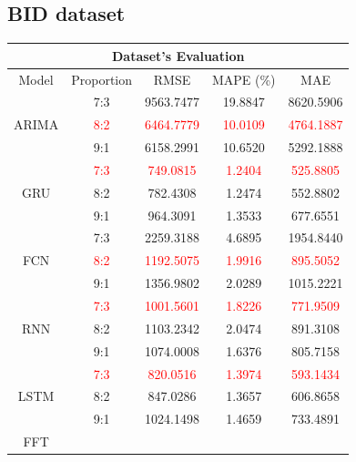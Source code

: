 \documentclass{ieeeojies}
\begin{document}
\subsection{BID dataset} 

\begin{table}[H]
    \centering
    \begin{tabular}{|c|c|c|c|c|}
         \hline
         \multicolumn{5}{|c|}{\textbf{Dataset's Evaluation}}\\
         \hline
         \centering Model & Proportion & RMSE & MAPE (\%) & MAE\\
         \hline
         \multirow{3}{*}{ARIMA} 
         & 7:3 & 9563.7477 & 19.8847 & 8620.5906 \\ 
         & \textcolor{red}{8:2} & \textcolor{red}{6464.7779} & \textcolor{red}{10.0109} & \textcolor{red}{4764.1887} \\ 
         & 9:1 & 6158.2991 & 10.6520 & 5292.1888 \\
         \hline
         \multirow{3}{*}{GRU} 
         & \textcolor{red}{7:3} & \textcolor{red}{749.0815} & \textcolor{red}{1.2404} & \textcolor{red}{525.8805} \\ 
         & 8:2 & 782.4308 & 1.2474 & 552.8802 \\
         & 9:1 & 964.3091 & 1.3533 & 677.6551 \\
         \hline
         \multirow{3}{*}{FCN} 
         & 7:3 & 2259.3188 & 4.6895 & 1954.8440 \\ 
         & \textcolor{red}{8:2} & \textcolor{red}{1192.5075} & \textcolor{red}{1.9916} & \textcolor{red}{895.5052} \\ 
         & 9:1 & 1356.9802 & 2.0289 & 1015.2221 \\
         \hline
         \multirow{3}{*}{RNN} 
         & \textcolor{red}{7:3} & \textcolor{red}{1001.5601} & \textcolor{red}{1.8226} & \textcolor{red}{771.9509} \\ 
         & 8:2 & 1103.2342 & 2.0474 & 891.3108 \\ 
         & 9:1 & 1074.0008 & 1.6376 & 805.7158 \\
         \hline
         \multirow{3}{*}{LSTM} 
         & \textcolor{red}{7:3} & \textcolor{red}{820.0516} & \textcolor{red}{1.3974} & \textcolor{red}{593.1434} \\ 
         & 8:2 & 847.0286 & 1.3657 & 606.8658 \\ 
         & 9:1 & 1024.1498 & 1.4659 & 733.4891 \\
         \hline
         \multirow{3}{*}{FFT} 

\end{tabular}
\end{table}
\end{document}

